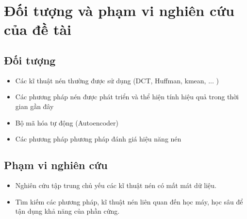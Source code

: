 \section{Đối tượng và phạm vi nghiên cứu của đề tài}
\subsection{Đối tượng}
\begin{itemize}
      \item Các kĩ thuật nén thường được sử dụng (DCT, Huffman, kmean, ... )
      \item Các phương pháp nén được phát triển và thể hiện tính hiệu quả trong thời gian gần đây
      \item Bộ mã hóa tự động (Autoencoder)
      \item Các phương pháp phương pháp đánh giá hiệu năng nén
\end{itemize}
\subsection{Phạm vi nghiên cứu}
\begin{itemize}
      \item Nghiên cứu tập trung chủ yếu các kĩ thuật nén có mất mát dữ liệu.
      \item Tìm kiếm các phương pháp, kĩ thuật nén liên quan đến học máy, học sâu để
            tận dụng khả năng của phần cứng.
\end{itemize}



